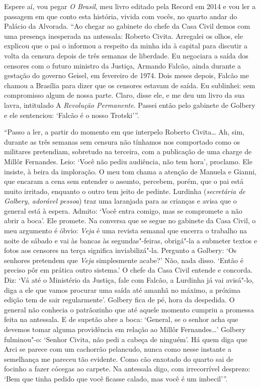 \normalfont 
Espere aí, vou pegar \emph{O Brasil}, meu livro editado
pela Record em 2014 e vou ler a passagem em que conto esta história,
vivida com vocês, no quarto andar do Palácio da Alvorada. ``Ao chegar ao
gabinete do chefe da Casa Civil demos com uma presença inesperada na
antessala: Roberto Civita. Arregalei os olhos, ele explicou que o pai o
informou a respeito da minha ida à capital para discutir a volta da
censura depois de três semanas de liberdade. Eu negociara a saída dos
censores com o futuro ministro da Justiça, Armando Falcão, ainda durante
a gestação do governo Geisel, em fevereiro de 1974. Dois meses depois,
Falcão me chamou a Brasília para dizer que os censores estavam de saída.
Eu sublinhei: sem compromisso algum de nossa parte. Claro, disse ele, e
me deu um livro da sua lavra, intitulado A \emph{Revolução Permanente}.
Passei então pelo gabinete de Golbery e ele sentenciou: `Falcão é o
nosso Trotski'''.

``Passo a ler, a partir do momento em que interpelo Roberto
Civita… Ah, sim, durante as três semanas sem censura não tínhamos
nos comportado como os militares pretendiam, sobretudo na terceira, com
a publicação de uma charge de Millôr Fernandes. Leio: `Você não pediu
audiência, não tem hora', proclamo. Ele insiste, à beira da imploração.
O meu tom chama a atenção de Manuela e Gianni, que encaram a cena sem
entender o assunto, percebem, porém, que o pai está muito irritado,
enquanto o outro tem jeito de pedinte. Lurdinha (\emph{secretária de
Golbery, adorável pessoa}) traz uma laranjada para as crianças e avisa
que o general está à espera. Admito: `Você entra comigo, mas se
compromete a não abrir a boca'. Ele promete. Na conversa que se segue no
gabinete da Casa Civil, o meu argumento é óbvio: \emph{Veja} é uma
revista semanal que encerra o trabalho na noite de sábado e vai às
bancas às segundas"-feiras, obrigá"-la a submeter textos e fotos aos
censores na terça significa inviabilizá"-la. Pergunto a Golbery: `Os
senhores pretendem que \emph{Veja} simplesmente acabe?' Não, nada disso.
`Então é preciso pôr em prática outro sistema.' O chefe da Casa Civil
entende e concorda. Diz: `Vá até o Ministério da Justiça, fale com
Falcão, a Lurdinha já vai avisá"-lo, diga a ele que vamos procurar uma
saída até amanhã no máximo, a próxima edição tem de sair regularmente'.
Golbery fica de pé, hora da despedida. O general não conhecia o
patrãozinho que até aquele momento cumpriu a promessa feita na
antessala. E de supetão abre a boca: `General, se o senhor acha que
devemos tomar alguma providência em relação ao Millôr Fernandes…'
Golbery fulminou"-o: `Senhor Civita, não pedi a cabeça de ninguém'. Há
quem diga que Arci se parece com um cachorrão pelancudo, nunca como
nesse instante a semelhança me pareceu tão evidente. Como cão enxotado
do quarto sai de focinho a fazer cócegas ao carpete. Na antessala digo,
com irrecorrível desprezo: `Bem que tinha pedido que você ficasse
calado, mas você é um imbecil'''.


